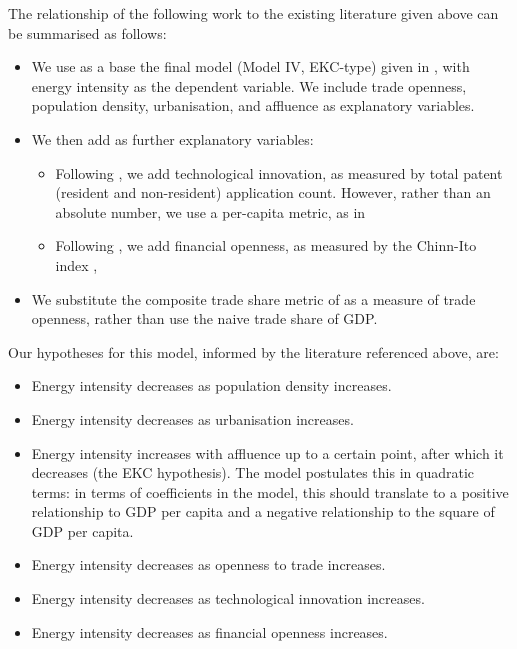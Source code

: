 \documentclass[12pt,a4paper]{article}
\begin{document}
The relationship of the following work to the existing literature given above can be summarised as follows: 
\begin{itemize}
\item We use as a base the final model (Model IV, EKC-type) given in \cite{rafiqUrbanizationOpennessEmissions2016}, with energy intensity as the dependent variable. 
We include trade openness, population density, urbanisation, and affluence as explanatory variables.
\item We then add as further explanatory variables:
\begin{itemize}
\item Following \cite{panHowIndustrializationTrade2019}, we add technological innovation, as measured by total patent (resident and non-resident) application count.
However, rather than an absolute number, we use a per-capita metric, as in \cite{maradanaDoesInnovationPromote2017}
\item Following \cite{koengkanPositiveImpactTrade2018}, we add financial openness, as measured by the Chinn-Ito index \citep{chinnWhatMattersFinancial2006}, 
\end{itemize}
\item We substitute the composite trade share metric of \cite{squalliNewMeasureTrade2011} as a measure of trade openness, rather than use the naive trade share of GDP.
\end{itemize}
Our hypotheses for this model, informed by the literature referenced above, are:
\begin{itemize}
\item Energy intensity decreases as population density increases.
\item Energy intensity decreases as urbanisation increases. 
\item Energy intensity increases with affluence up to a certain point, after which it decreases (the EKC hypothesis).
The model postulates this in quadratic terms: in terms of coefficients in the model, this should translate to a positive relationship to GDP per capita and a negative relationship to the square of GDP per capita.
\item Energy intensity decreases as openness to trade increases. 
\item Energy intensity decreases as technological innovation increases. 
\item Energy intensity decreases as financial openness increases. 
\end{itemize}
\end{document}
